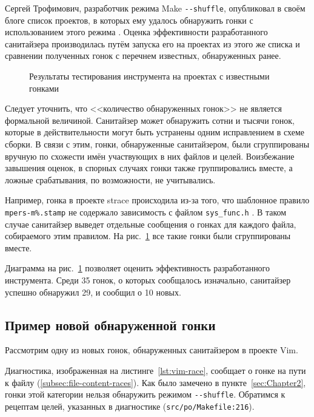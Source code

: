 Сергей Трофимович, разработчик режима Make \texttt{-{}-shuffle}, опубликовал в своём блоге список проектов, в которых ему удалось обнаружить гонки с использованием этого режима \cite{trofi-make-shuffle}. Оценка эффективности разработанного санитайзера производилась путём запуска его на проектах из этого же списка и сравнении полученных гонок с перечнем известных, обнаруженных ранее.

\begin{figure}[H]
    \centering
    
    \caption{Результаты тестирования инструмента на проектах с известными гонками}
    \label{fig:testing-results}
\end{figure}

Следует уточнить, что <<количество обнаруженных гонок>> не является формальной величиной. Санитайзер может обнаружить сотни и тысячи гонок, которые в действительности могут быть устранены одним исправлением в схеме сборки. В связи с этим, гонки, обнаруженные санитайзером, были сгруппированы вручную по схожести имён участвующих в них файлов и целей. Воизбежание завышения оценок, в спорных случаях гонки также группировались вместе, а ложные срабатывания, по возможности, не учитывались.

Например, гонка в проекте strace происходила из-за того, что шаблонное правило \texttt{mpers-m\%.stamp} не содержало зависимость с файлом \texttt{sys\_func.h} \cite{strace-race}. В таком случае санитайзер выведет отдельные сообщения о гонках для каждого файла, собираемого этим правилом. На рис.~\ref{fig:testing-results} все такие гонки были сгруппированы вместе.

Диаграмма на рис.~\ref{fig:testing-results} позволяет оценить эффективность разработанного инструмента. Среди 35 гонок, о которых сообщалось изначально, санитайзер успешно обнаружил 29, и сообщил о 10 новых.

\subsection{Пример новой обнаруженной гонки}

Рассмотрим одну из новых гонок, обнаруженных санитайзером в проекте Vim.



Диагностика, изображенная на листинге~\ref{lst:vim-race}, сообщает о гонке на пути к файлу (\ref{subsec:file-content-races}). Как было замечено в пункте~\ref{sec:Chapter2}, гонки этой категории нельзя обнаружить режимом \texttt{-{}-shuffle}. Обратимся к рецептам целей, указанных в диагностике (\texttt{src/po/Makefile:216}).

